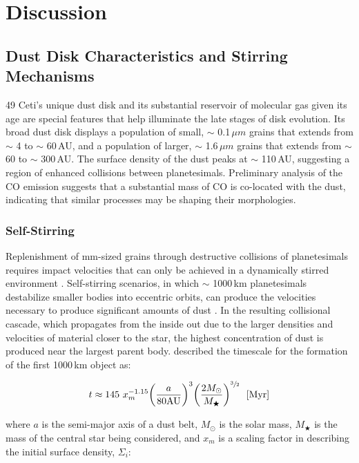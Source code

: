 \chapter{Discussion}
\label{Discussion}

\section{Dust Disk Characteristics and Stirring Mechanisms}

49 Ceti's unique dust disk and its substantial reservoir of molecular gas given its age are special features that help illuminate the late stages of disk evolution. Its broad dust disk displays a population of small, $\sim$ 0.1\,$\mu m$ grains that extends from $\sim$ 4 to $\sim$ 60\,AU, and a population of larger, $\sim$ 1.6\,$\mu m$ grains that extends from $\sim$ 60 to $\sim$ 300\,AU. The surface density of the dust peaks at $\sim$ 110\,AU, suggesting a region of enhanced collisions between planetesimals. Preliminary analysis of the CO emission suggests that a substantial mass of CO is co-located with the dust, indicating that similar processes may be shaping their morphologies. 

\subsection{Self-Stirring}
\label{SelfStirring}

Replenishment of mm-sized grains through destructive collisions of planetesimals requires impact velocities that can only be achieved in a dynamically stirred environment \citep{Moor13}. Self-stirring scenarios, in which $\sim$ 1000\,km planetesimals destabilize smaller bodies into eccentric orbits, can produce the velocities necessary to produce significant amounts of dust \citep{Keny04}. In the resulting collisional cascade, which propagates from the inside out due to the larger densities and velocities of material closer to the star, the highest concentration of dust is produced near the largest parent body. \cite{Keny08} described the timescale for the formation of the first 1000\,km object as: %

\begin{equation}
\label{eq:t1000km}
t \approx 145~x_{m}^{-1.15}\bigg(\frac{a}{80\text{AU}}\bigg)^{3}\bigg(\frac{2M_{\odot}}{M_{\bigstar}}\bigg)^{\sfrac{3}{2}} ~~[\text{Myr}]
\end{equation}

where $a$ is the semi-major axis of a dust belt, $M_{\odot}$ is the solar mass, $M_{\bigstar}$ is the mass of the central star being considered, and $x_{m}$ is a scaling factor in describing the initial surface density, $\Sigma_{i}$:

